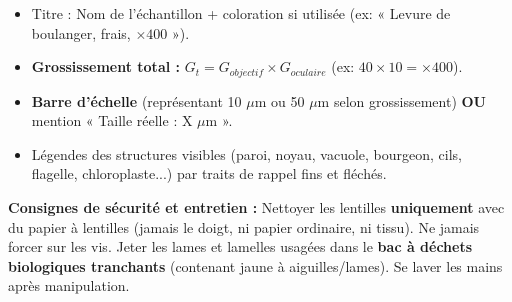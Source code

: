 \documentclass[11pt]{article}
\begin{document}
\begin{methode}
\begin{enumerate}
\begin{itemize}
                  \item Titre : Nom de l'échantillon + coloration si utilisée (ex: « Levure de boulanger, frais, $\times 400$ »).
                  \item \textbf{Grossissement total :} $G_t = G_{objectif} \times G_{oculaire}$ (ex: $40 \times 10 = \times 400$).
                  \item \textbf{Barre d'échelle} (représentant 10 $\mu$m ou 50 $\mu$m selon grossissement) \textbf{OU} mention « Taille réelle : X $\mu$m ».
                  \item Légendes des structures visibles (paroi, noyau, vacuole, bourgeon, cils, flagelle, chloroplaste...) par traits de rappel fins et fléchés.
              \end{itemize}
    \end{enumerate}
    \textbf{Consignes de sécurité et entretien :} Nettoyer les lentilles \textbf{uniquement} avec du papier à lentilles (jamais le doigt, ni papier ordinaire, ni tissu). Ne jamais forcer sur les vis. Jeter les lames et lamelles usagées dans le \textbf{bac à déchets biologiques tranchants} (contenant jaune à aiguilles/lames). Se laver les mains après manipulation.
\end{methode}
\end{document}
